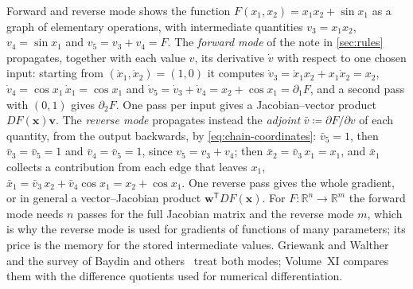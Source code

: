 \begin{note}{Forward and reverse mode}
 shows the function $F(x_1,x_2)=x_1x_2+\sin x_1$ as a graph of elementary operations, with intermediate quantities $v_3=x_1x_2$, $v_4=\sin x_1$ and $v_5=v_3+v_4=F$. The \emph{forward mode} of the note in \cref{sec:rules} propagates, together with each value $v$, its derivative $\dot v$ with respect to one chosen input: starting from $(\dot x_1,\dot x_2)=(1,0)$ it computes $\dot v_3=\dot x_1x_2+x_1\dot x_2=x_2$, $\dot v_4=\cos x_1\,\dot x_1=\cos x_1$ and $\dot v_5=\dot v_3+\dot v_4=x_2+\cos x_1=\partial_1F$, and a second pass with $(0,1)$ gives $\partial_2F$. One pass per input gives a Jacobian--vector product $DF(\mathbf x)\mathbf v$. The \emph{reverse mode} propagates instead the \emph{adjoint} $\bar v\coloneqq\partial F/\partial v$ of each quantity, from the output backwards, by \eqref{eq:chain-coordinates}: $\bar v_5=1$, then $\bar v_3=\bar v_5=1$ and $\bar v_4=\bar v_5=1$, since $v_5=v_3+v_4$; then $\bar x_2=\bar v_3\,x_1=x_1$, and $\bar x_1$ collects a contribution from each edge that leaves $x_1$, $\bar x_1=\bar v_3\,x_2+\bar v_4\cos x_1=x_2+\cos x_1$. One reverse pass gives the whole gradient, or in general a vector--Jacobian product $\mathbf w^{\mathsf T}DF(\mathbf x)$. For $F\colon\mathbb R^n\to\mathbb R^m$ the forward mode needs $n$ passes for the full Jacobian matrix and the reverse mode $m$, which is why the reverse mode is used for gradients of functions of many parameters; its price is the memory for the stored intermediate values. Griewank and Walther~\cite{griewank2008} and the survey of Baydin and others~\cite{baydin2018} treat both modes; Volume~XI compares them with the difference quotients used for numerical differentiation.
\end{note}

